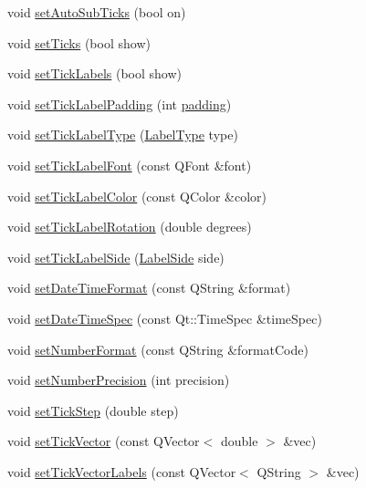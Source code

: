 \begin{DoxyCompactItemize}
void \hyperlink{classQCPAxis_adcbdec7a60054b88571e89599f4a45bf}{set\+Auto\+Sub\+Ticks} (bool on)
\item 
void \hyperlink{classQCPAxis_ac891409315bc379e3b1abdb162c1a011}{set\+Ticks} (bool show)
\item 
void \hyperlink{classQCPAxis_a04ba16e1f6f78d70f938519576ed32c8}{set\+Tick\+Labels} (bool show)
\item 
void \hyperlink{classQCPAxis_af302c479af9dbc2e9f0e44e07c0012ee}{set\+Tick\+Label\+Padding} (int \hyperlink{classQCPAxis_abb85015a9467ec176e70698307ec833a}{padding})
\item 
void \hyperlink{classQCPAxis_a54f24f5ce8feea25209388a863d7e448}{set\+Tick\+Label\+Type} (\hyperlink{classQCPAxis_a4a7da0166f755f5abac23b765d184cad}{Label\+Type} type)
\item 
void \hyperlink{classQCPAxis_a2b8690c4e8dbc39d9185d2b398ce7a6c}{set\+Tick\+Label\+Font} (const Q\+Font \&font)
\item 
void \hyperlink{classQCPAxis_a395e445c3fe496b935bee7b911ecfd1c}{set\+Tick\+Label\+Color} (const Q\+Color \&color)
\item 
void \hyperlink{classQCPAxis_a1bddd4413df8a576b7ad4b067fb33375}{set\+Tick\+Label\+Rotation} (double degrees)
\item 
void \hyperlink{classQCPAxis_a13ec644fc6e22715744c92c6dfa4f0fa}{set\+Tick\+Label\+Side} (\hyperlink{classQCPAxis_a24b13374b9b8f75f47eed2ea78c37db9}{Label\+Side} side)
\item 
void \hyperlink{classQCPAxis_a2ee0191daa03524a682113e63e05f7a7}{set\+Date\+Time\+Format} (const Q\+String \&format)
\item 
void \hyperlink{classQCPAxis_a262e06731debed7eee11fa6a81d67eaf}{set\+Date\+Time\+Spec} (const Qt\+::\+Time\+Spec \&time\+Spec)
\item 
void \hyperlink{classQCPAxis_ae585a54dc2aac662e90a2ca82f002590}{set\+Number\+Format} (const Q\+String \&format\+Code)
\item 
void \hyperlink{classQCPAxis_a21dc8023ad7500382ad9574b48137e63}{set\+Number\+Precision} (int precision)
\item 
void \hyperlink{classQCPAxis_af727db0acc6492c4c774c0700e738205}{set\+Tick\+Step} (double step)
\item 
void \hyperlink{classQCPAxis_a871db94c5d796c80fcbe1a9d4506e27e}{set\+Tick\+Vector} (const Q\+Vector$<$ double $>$ \&vec)
\item 
void \hyperlink{classQCPAxis_a921d3ba3853ca3bd2cce3459f7a243ed}{set\+Tick\+Vector\+Labels} (const Q\+Vector$<$ Q\+String $>$ \&vec)

\end{DoxyCompactItemize}
